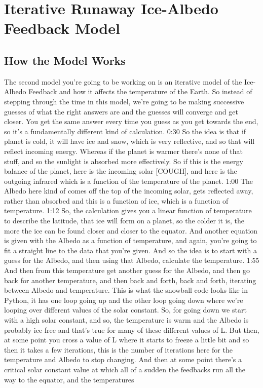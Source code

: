 {\section{Iterative Runaway Ice-Albedo Feedback Model}

\subsection{How the Model Works}\index{}

The second model you're going to be working on is an iterative model of the Ice-Albedo Feedback and how it affects the temperature of the Earth. So instead of stepping through the time in this model, we're going to be making successive guesses of what the right answers are and the guesses will converge and get closer. You get the same answer every time you guess as you get towards the end, so it's a fundamentally different kind of calculation. 
0:30
So the idea is that if planet is cold, it will have ice and snow, which is very reflective, and so that will reflect incoming energy. Whereas if the planet is warmer there's none of that stuff, and so the sunlight is absorbed more effectively. So if this is the energy balance of the planet, here is the incoming solar [COUGH], and here is the outgoing infrared which is a function of the temperature of the planet. 
1:00
The Albedo here kind of comes off the top of the incoming solar, gets reflected away, rather than absorbed and this is a function of ice, which is a function of temperature. 
1:12
So, the calculation gives you a linear function of temperature to describe the latitude, that ice will form on a planet, so the colder it is, the more the ice can be found closer and closer to the equator. And another equation is given with the Albedo as a function of temperature, and again, you're going to fit a straight line to the data that you're given. And so the idea is to start with a guess for the Albedo, and then using that Albedo, calculate the temperature. 
1:55
And then from this temperature get another guess for the Albedo, and then go back for another temperature, and then back and forth, back and forth, iterating between Albedo and temperature. This is what the snowball code looks like in Python, it has one loop going up and the other loop going down where we're looping over different values of the solar constant. So, for going down we start with a high solar constant, and so, the temperature is warm and the Albedo is probably ice free and that's true for many of these different values of L. But then, at some point you cross a value of L where it starts to freeze a little bit and so then it takes a few iterations, this is the number of iterations here for the temperature and Albedo to stop changing. And then at some point there's a critical solar constant value at which all of a sudden the feedbacks run all the way to the equator, and the temperatures 
}
